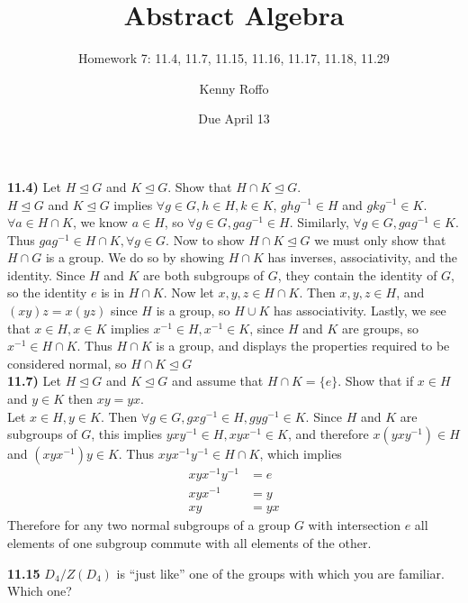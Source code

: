 \documentclass{scrartcl}
\title{Abstract Algebra}
\subtitle{Homework 7: 11.4, 11.7, 11.15, 11.16, 11.17, 11.18, 11.29}
\author{Kenny Roffo}
\date{Due April 13}
\newcommand{\normal}{\unlhd}
\begin{document}
\maketitle

\textbf{11.4)} Let $H\normal G$ and $K\normal G$. Show that $H\cap K\normal G$.\\

$H \normal G$ and $K \normal G$ implies $\forall g \in G, h \in H, k \in K$, $ghg^{-1} \in H$ and $gkg^{-1} \in K$. $\forall a \in H \cap K$, we know $a \in H$, so $\forall g \in G, gag^{-1} \in H$. Similarly, $\forall g \in G, gag^{-1} \in K$. Thus $gag^{-1} \in H \cap K, \forall g \in G$. Now to show $H \cap K \normal G$ we must only show that $H \cap G$ is a group. We do so by showing $H \cap K$ has inverses, associativity, and the identity. Since $H$ and $K$ are both subgroups of $G$, they contain the identity of $G$, so the identity $e$ is in $H \cap K$. Now let $x,y,z \in H \cap K$. Then $x,y,z \in H$, and $(xy)z=x(yz)$ since $H$ is a group, so $H \cup K$ has associativity. Lastly, we see that $x \in H, x \in K$ implies $x^{-1} \in H, x^{-1} \in K$, since $H$ and $K$ are groups, so $x^{-1} \in H \cap K$. Thus $H \cap K$ is a group, and displays the properties required to be considered normal, so $H \cap K \normal G$\\

\textbf{11.7)} Let $H \normal G$ and $K \normal G$ and assume that $H \cap K = \{e\}$. Show that if $x \in H$ and $y \in K$ then $xy=yx$.\\

Let $x \in H, y \in K$. Then $\forall g \in G, gxg^{-1} \in H, gyg^{-1} \in K$. Since $H$ and $K$ are subgroups of $G$, this implies $yxy^{-1} \in H, xyx^{-1} \in K$, and therefore $x(yxy^{-1}) \in H$ and $(xyx^{-1})y \in K$. Thus $xyx^{-1}y^{-1} \in H \cap K$, which implies
\begin{align*}
xyx^{-1}y^{-1}&=e\\
xyx^{-1}&=y\\
xy&=yx
\end{align*}
Therefore for any two normal subgroups of a group $G$ with intersection ${e}$ all elements of one subgroup commute with all elements of the other.\pagebreak

\textbf{11.15} $D_4/Z(D_4)$ is ``just like'' one of the groups with which you are familiar. Which one?\\
\end{document}
